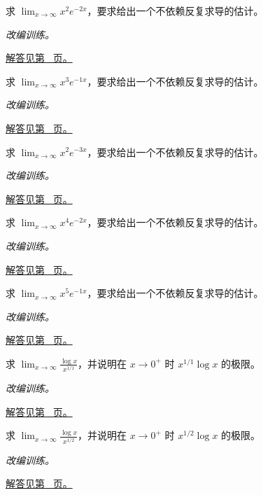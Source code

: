 \documentclass[12pt,fontset=fandol]{ctexart}
\begin{document}
\begin{example}[指数增长压过多项式]\label{ex:c4q8}
求 $\displaystyle\lim_{x\to\infty}x^{2}e^{-2x}$，要求给出一个不依赖反复求导的估计。
\par\textit{改编训练。}\par\hyperref[ans:c4q8]{解答见第~\pageref{ans:c4q8} 页。}
\end{example}
\begin{example}[指数增长压过多项式]\label{ex:c4q9}
求 $\displaystyle\lim_{x\to\infty}x^{3}e^{-1x}$，要求给出一个不依赖反复求导的估计。
\par\textit{改编训练。}\par\hyperref[ans:c4q9]{解答见第~\pageref{ans:c4q9} 页。}
\end{example}
\begin{example}[指数增长压过多项式]\label{ex:c4q10}
求 $\displaystyle\lim_{x\to\infty}x^{2}e^{-3x}$，要求给出一个不依赖反复求导的估计。
\par\textit{改编训练。}\par\hyperref[ans:c4q10]{解答见第~\pageref{ans:c4q10} 页。}
\end{example}
\begin{example}[指数增长压过多项式]\label{ex:c4q11}
求 $\displaystyle\lim_{x\to\infty}x^{4}e^{-2x}$，要求给出一个不依赖反复求导的估计。
\par\textit{改编训练。}\par\hyperref[ans:c4q11]{解答见第~\pageref{ans:c4q11} 页。}
\end{example}
\begin{example}[指数增长压过多项式]\label{ex:c4q12}
求 $\displaystyle\lim_{x\to\infty}x^{5}e^{-1x}$，要求给出一个不依赖反复求导的估计。
\par\textit{改编训练。}\par\hyperref[ans:c4q12]{解答见第~\pageref{ans:c4q12} 页。}
\end{example}
\begin{example}[对数增长慢于正幂]\label{ex:c4q13}
求 $\displaystyle\lim_{x\to\infty}\frac{\log x}{x^{1/1}}$，并说明在 $x\to0^+$ 时 $x^{1/1}\log x$ 的极限。
\par\textit{改编训练。}\par\hyperref[ans:c4q13]{解答见第~\pageref{ans:c4q13} 页。}
\end{example}
\begin{example}[对数增长慢于正幂]\label{ex:c4q14}
求 $\displaystyle\lim_{x\to\infty}\frac{\log x}{x^{1/2}}$，并说明在 $x\to0^+$ 时 $x^{1/2}\log x$ 的极限。
\par\textit{改编训练。}\par\hyperref[ans:c4q14]{解答见第~\pageref{ans:c4q14} 页。}
\end{example}
\end{document}

